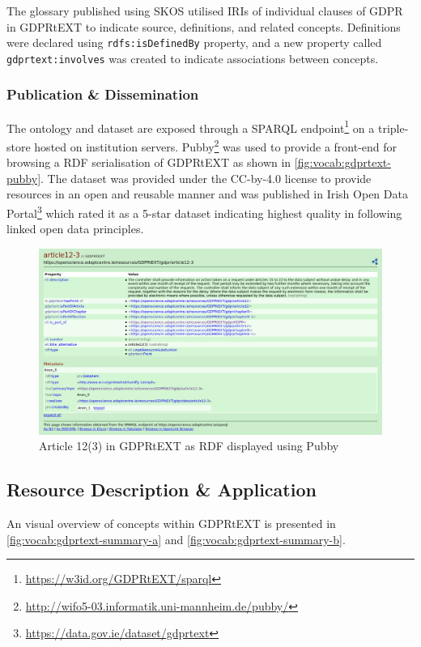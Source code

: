The glossary published using SKOS utilised IRIs of individual clauses of GDPR in GDPRtEXT to indicate source, definitions, and related concepts. Definitions were declared using \texttt{rdfs:isDefinedBy} property, and a new property called \texttt{gdprtext:involves} was created to indicate associations between concepts. 

\subsubsection{Publication \& Dissemination}
The ontology and dataset are exposed through a SPARQL endpoint\footnote{\url{https://w3id.org/GDPRtEXT/sparql}} on a triple-store hosted on institution servers. Pubby\footnote{\url{http://wifo5-03.informatik.uni-mannheim.de/pubby/}} was used to provide a front-end for browsing a RDF serialisation of GDPRtEXT as shown in \autoref{fig:vocab:gdprtext-pubby}. The dataset was provided under the CC-by-4.0 license to provide resources in an open and reusable manner and was published in Irish Open Data Portal\footnote{\url{https://data.gov.ie/dataset/gdprtext}} which rated it as a 5-star dataset indicating highest quality in following linked open data principles.
\begin{figure}[htbp]
    \centering
    \includegraphics[width=\linewidth]{img/gdprtext-pubby}
    \caption{Article 12(3) in GDPRtEXT as RDF displayed using Pubby \cite{pandit_gdprtext_2018}}
    \label{fig:vocab:gdprtext-pubby}
\end{figure}

\subsection{Resource Description \& Application}
An visual overview of concepts within GDPRtEXT is presented in \autoref{fig:vocab:gdprtext-summary-a} and \autoref{fig:vocab:gdprtext-summary-b}.

